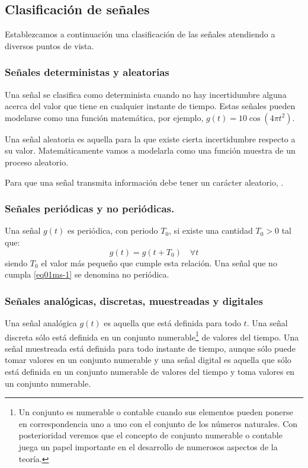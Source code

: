 \subsection{Clasificación de señales}%
Establezcamos a continuación una clasificación de las señales atendiendo a diversos puntos de vista.
%
\subsubsection*{Señales deterministas y aleatorias}
%
Una señal se clasifica como determinista cuando no hay incertidumbre alguna acerca del valor que tiene en cualquier instante de tiempo. Estas señales pueden modelarse como una función matemática, por ejemplo, $g\left( {t} \right) = 10 \cos\left( {4\pi t^{2}} \right)$. 

Una señal aleatoria es aquella para la que existe cierta incertidumbre respecto a su valor. Matemáticamente vamos a modelarla como una función muestra de un proceso aleatorio.

Para que una señal transmita información debe tener un carácter aleatorio, \cite{wiener}. 
%
\subsubsection*{Señales periódicas y no periódicas.}
%
Una señal $g(t)$ es periódica, con periodo $T_{0}$, si existe una cantidad $T_{0} >$0 tal que:
\begin{equation}
\label{eq01ms-1}
g(t)=g(t+T_0 )\quad \forall t
\end{equation}
siendo $T_{0}$ el valor más pequeño que cumple esta relación. Una señal que no cumpla \eqref{eq01ms-1} se denomina no periódica.
%
\subsubsection*{Señales analógicas, discretas, muestreadas y digitales}
%
Una señal analógica $g(t)$ es aquella que está definida para todo $t$. Una señal discreta sólo está definida en un conjunto numerable\footnote{\label{foot02-01}Un conjunto  es numerable o contable cuando sus elementos pueden ponerse en correspondencia uno a uno con el conjunto de los números naturales. Con posterioridad veremos que el concepto de conjunto numerable o contable juega un papel importante en el desarrollo de numerosos aspectos de la teoría.} de valores del tiempo. Una señal muestreada está definida para todo instante de tiempo, aunque sólo puede tomar valores en un conjunto numerable y una señal digital es aquella que sólo está definida en un conjunto numerable de valores del tiempo y toma valores en un conjunto numerable.
%





\captionsetup[figure]{textformat=period}
\endinput

